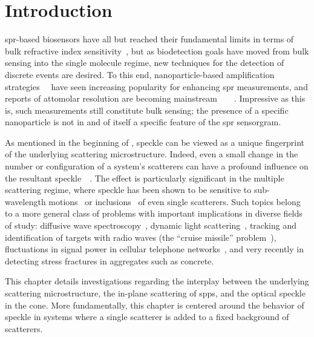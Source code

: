 \section{Introduction}
\gls{spr}-based biosensors have all but reached their fundamental limits in terms of
bulk refractive index sensitivity~\cite{piliarik2009surface}, but as
biodetection goals have moved from bulk sensing into the single molecule
regime, new techniques for the detection of discrete events are desired.  To
this end, nanoparticle-based amplification
strategies~\cite{wang2005nanomaterial}~\cite{jain2007review} have seen
increasing popularity for enhancing \gls{spr} measurements, and reports of attomolar
resolution are becoming
mainstream~\cite{fang2006attomole}~\cite{krishnan2011attomolar}~\cite{kwon2012nanoparticle}~\cite{sim2010attomolar}.
Impressive as this is, such measurements still constitute bulk sensing; the
presence of a specific nanoparticle is not in and of itself a specific feature
of the \gls{spr} sensorgram.

As mentioned in the beginning of , speckle can be viewed as
a unique fingerprint~\cite{ravikanth2001physical} of the underlying scattering
microstructure.  Indeed, even a small change in the number or configuration of
a system's scatterers can have a profound influence on the resultant
speckle~\cite{berkovits1994correlations}~\cite{feng1986sensitivity}.  The
effect is particularly significant in the multiple scattering regime, where
speckle has been shown to be sensitive to sub-wavelength
motions~\cite{berkovits1991sensitivity} or
inclusions~\cite{berkovits1990theory} of even single scatterers.  Such topics
belong to a more general class of problems with important implications in
diverse fields of study: diffusive wave spectroscopy~\cite{pine1988diffusing},
dynamic light scattering~\cite{berne2000dynamic}, tracking and identification
of targets with radio waves (the ``cruise missile''
problem~\cite{atkins1991neural}), fluctuations in signal power in cellular
telephone networks~\cite{abdi2001estimation}, and very recently in detecting
stress fractures in aggregates such as concrete.

This chapter details investigations regarding the interplay between the
underlying scattering microstructure, the in-plane scattering of \glspl{spp}, and
the optical speckle in the cone.  More fundamentally, this chapter is
centered around the behavior of speckle in systems where a single scatterer
is added to a fixed background of scatterers.
